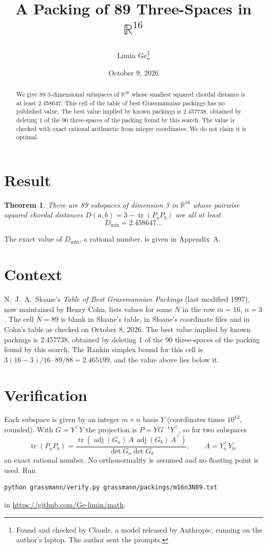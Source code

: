 \documentclass[11pt,a4paper]{article}
\title{A Packing of 89 Three-Spaces in $\mathbb{R}^{16}$}
\author{Limin Ge\thanks{Found and checked by Claude, a model released by Anthropic, running on the author's laptop. The author sent the prompts.}}
\date{October 9, 2026}
\newtheorem*{theorem}{Theorem}
\begin{document}
\maketitle
\begin{abstract}
We give 89 3-dimensional subspaces of $\mathbb{R}^{16}$ whose smallest squared chordal distance is at least 2.458647. This cell of the table of best Grassmannian packings has no published value. The best value implied by known packings is 2.457738, obtained by deleting 1 of the 90 three-spaces of the packing found by this search. The value is checked with exact rational arithmetic from integer coordinates. We do not claim it is optimal.
\end{abstract}

\section{Result}
\begin{theorem}
There are 89 subspaces of dimension 3 in $\mathbb{R}^{16}$ whose pairwise squared chordal distances $D(a,b) = 3 - \operatorname{tr}(P_aP_b)$ are all at least
\[ D_{\min} = 2.458647\ldots \]
\end{theorem}
The exact value of $D_{\min}$, a rational number, is given in Appendix~A.


\section{Context}
N.~J.~A.~Sloane's \emph{Table of Best Grassmannian Packings} (last modified 1997), now maintained by Henry Cohn, lists values for some $N$ in the row $m=16$, $n=3$. The cell $N=89$ is blank in Sloane's table, in Sloane's coordinate files and in Cohn's table as checked on October 8, 2026. The best value implied by known packings is 2.457738, obtained by deleting 1 of the 90 three-spaces of the packing found by this search. The Rankin simplex bound for this cell is $3(16-3)/16\cdot 89/88 = 2.465199$, and the value above lies below it.


\section{Verification}
Each subspace is given by an integer $m\times n$ basis $Y$ (coordinates times $10^{12}$, rounded). With $G=Y^\top Y$ the projection is $P=YG^{-1}Y^\top$, so for two subspaces
\[ \operatorname{tr}(P_aP_b)=\frac{\operatorname{tr}(\operatorname{adj}(G_a)\,A\,\operatorname{adj}(G_b)\,A^\top)}{\det G_a\det G_b},\qquad A=Y_a^\top Y_b, \]
an exact rational number. No orthonormality is assumed and no floating point is used. Run
\begin{verbatim}
python grassmann/verify.py grassmann/packings/m16n3N89.txt
\end{verbatim}
in \url{https://github.com/Ge-limin/math}.
\end{document}
